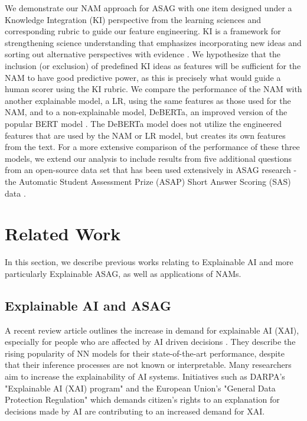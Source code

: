 We demonstrate our NAM approach for ASAG with one item designed under a Knowledge Integration (KI) perspective from the learning sciences and corresponding rubric to guide our feature engineering. KI is a framework for strengthening science understanding that emphasizes incorporating new ideas and sorting out alternative perspectives with evidence \cite{linn2000designing}. We hypothesize that the inclusion (or exclusion) of predefined KI ideas as features will be sufficient for the NAM to have good predictive power, as this is precisely what would guide a human scorer using the KI rubric. We compare the performance of the NAM with another explainable model, a LR, using the same features as those used for the NAM, and to a non-explainable model, DeBERTa, an improved version of the popular BERT model \cite{he2021debertav3}. The DeBERTa model does not utilize the engineered features that are used by the NAM or LR model, but creates its own features from the text. For a more extensive comparison of the performance of these three models, we extend our analysis to include results from five additional questions from an open-source data set that has been used extensively in ASAG research - the Automatic Student Assessment Prize (ASAP) Short Answer Scoring (SAS) data \cite{prize2019hewlett}. 

\section{Related Work}
In this section, we describe previous works relating to Explainable AI and more particularly Explainable ASAG, as well as applications of NAMs.
\subsection{Explainable AI and ASAG}
A recent review article outlines the increase in demand for explainable AI (XAI), especially for people who are affected by AI driven decisions \cite{xu2019explainable}. They describe the rising popularity of NN models for their state-of-the-art  performance, despite that their inference processes are not known or interpretable. Many researchers aim to increase the explainability of AI systems. Initiatives such as DARPA’s "Explainable AI (XAI) program" \cite{gunning2019darpa} and the European Union’s "General Data Protection Regulation" which demands citizen’s rights to an explanation for decisions made by AI \cite{Goodman2017} are contributing to an increased demand for XAI. 
	
